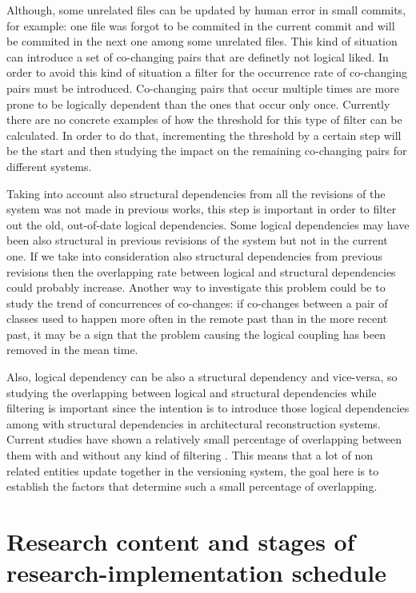 \documentclass[12pt,a4paper,oneside]{report}
\begin{document}
Although, some unrelated files can be updated by human error in small commits, for example: one file was forgot to be commited in the current commit and will be commited in the next one among some unrelated files. This kind of situation can introduce a set of co-changing pairs that are definetly not logical liked. In order to avoid this kind of situation a filter for the occurrence rate of co-changing pairs must be introduced. Co-changing pairs that occur multiple times are more prone to be logically dependent than the ones that occur only once. Currently there are no concrete examples of how the threshold for this type of filter can be calculated. In order to do that, incrementing the threshold by a certain step will be the start and then studying the impact on the remaining co-changing pairs for different systems. 

Taking into account also structural dependencies from all the revisions of the system was not made in previous works, this step is important in order to filter out the old, out-of-date logical dependencies. Some logical dependencies may have been also structural in previous revisions of the system but not in the current one. If we take into consideration also structural dependencies from previous revisions then the overlapping rate between logical and structural dependencies could probably increase. Another way to investigate this problem could be to study the trend of concurrences of co-changes: if co-changes between a pair of classes used to happen more often in the remote past than in the more recent past, it may be a sign that the problem causing the logical coupling has been removed in the mean time. 

Also, logical dependency can be also a structural dependency and vice-versa, so studying the overlapping between logical and structural dependencies while filtering is important since the intention is to introduce those logical dependencies among with structural dependencies in architectural reconstruction systems. Current studies have shown a relatively small percentage of overlapping between them with and without any kind of filtering \cite{DBLP:journals/jss/AjienkaC17}. This means that a lot of non related entities update together in the versioning system, the goal here is to establish the factors that determine such a small percentage of overlapping.
 


{\let\clearpage\relax \chapter{Research content and stages of research-implementation schedule}}
\end{document}
